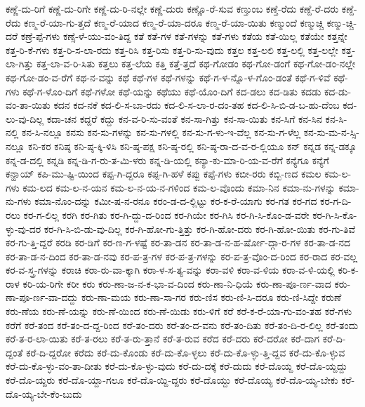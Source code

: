 {ಕಣ್ಣೆ-ದು-ರಿಗೆ
ಕಣ್ಣೆ-ದು-ರಿಗೇ
ಕಣ್ಣೆ-ದು-ರಿ-ನಲ್ಲೇ
ಕಣ್ಣೆ-ದುರು
ಕಣ್ಣೊ-ರೆ-ಸುವ
ಕಣ್ತುಂಬ
ಕಣ್ತೆ-ರೆದು
ಕಣ್ದೆ-ರೆ-ದರು
ಕಣ್ದೆ-ರೆದು
ಕಣ್ಮ-ರೆ-ಯಾ-ಗು-ತ್ತದೆ
ಕಣ್ಮ-ರೆ-ಯಾದ
ಕಣ್ಮ-ರೆ-ಯಾ-ದರೂ
ಕಣ್ಮ-ರೆ-ಯಾ-ಯಿತು
ಕಣ್ಮುಂದೆ
ಕಣ್ಮುಚ್ಚಿ
ಕಣ್ಮು-ಚ್ಚಿ-ದರೆ
ಕಣ್ರೆ-ಪ್ಪೆ-ಗಳು
ಕಣ್ಸೆ-ಳೆ-ಯು-ವಂ-ತಿದ್ದ
ಕತೆ
ಕತೆ-ಗಳ
ಕತೆ-ಗಳನ್ನು
ಕತೆ-ಗಳು
ಕತೆಯ
ಕತೆ-ಯಿಲ್ಲ
ಕತೆಯೇ
ಕತ್ತನ್ನೇ
ಕತ್ತ-ರಿ-ಕೆ-ಗಳು
ಕತ್ತ-ರಿ-ಸ-ಲಾ-ರದು
ಕತ್ತ-ರಿಸಿ
ಕತ್ತ-ರಿಸು
ಕತ್ತ-ರಿ-ಸು-ವುದು
ಕತ್ತಲ
ಕತ್ತ-ಲಲಿ
ಕತ್ತ-ಲಲ್ಲಿ
ಕತ್ತ-ಲಲ್ಲೇ
ಕತ್ತ-ಲಾ-ಗಿತ್ತು
ಕತ್ತ-ಲಾ-ವ-ರಿ-ಸಿತು
ಕತ್ತಲು
ಕತ್ತ-ಲೆಯ
ಕತ್ತಿ
ಕತ್ತೆ-ತ್ತದೆ
ಕಥ-ಗೋಡಂ
ಕಥ-ಗೋ-ಡಂಗೆ
ಕಥ-ಗೋ-ಡಂ-ನಲ್ಲೇ
ಕಥ-ಗೋ-ಡಂ-ವ-ರೆಗೆ
ಕಥ-ನ-ವನ್ನು
ಕಥೆ
ಕಥೆ-ಗಳ
ಕಥೆ-ಗಳನ್ನು
ಕಥೆ-ಗ-ಳ-ನ್ನೊ-ಳ-ಗೊಂ-ಡಂತೆ
ಕಥೆ-ಗ-ಳಿವೆ
ಕಥೆ-ಗಳು
ಕಥೆ-ಗ-ಳೊಂ-ದಿಗೆ
ಕಥೆ-ಗಳೋ
ಕಥೆ-ಯನ್ನು
ಕಥೆಯು
ಕಥೆ-ಯೊಂ-ದಿಗೆ
ಕದ-ಡಲು
ಕದ-ಡಿತು
ಕದಡು
ಕದ-ಡು-ವಂ-ತಾ-ಯಿತು
ಕದನ
ಕದ-ನಕೆ
ಕದ-ಲಿ-ಸ-ಬಾ-ರದು
ಕದ-ಲಿ-ಸ-ಲಾ-ರ-ದಂ-ತಹ
ಕದ-ಲಿ-ಸಿ-ಬಿ-ಡ-ಬ-ಹು-ದೆಂಬ
ಕದ-ಲು-ವು-ದಿಲ್ಲ
ಕದಾ-ಚನ
ಕದ್ದರೆ
ಕದ್ದು
ಕನ-ವ-ರಿ-ಸು-ವಂತೆ
ಕನ-ಸಾ-ಗಿತ್ತು
ಕನ-ಸಾ-ಯಿತು
ಕನ-ಸಿಗೆ
ಕನ-ಸಿನ
ಕನ-ಸಿ-ನಲ್ಲಿ
ಕನ-ಸಿ-ನಲ್ಲೂ
ಕನಸು
ಕನ-ಸು-ಗಳನ್ನು
ಕನ-ಸು-ಗಳಲ್ಲಿ
ಕನ-ಸು-ಗ-ಳು-ಇ-ವೆಲ್ಲ
ಕನ-ಸು-ಗ-ಳೆಲ್ಲ
ಕನ-ಸು-ಮ-ನ-ಸ್ಸಿ-ನಲ್ಲೂ
ಕನಿ-ಕರ
ಕನಿಷ್ಠ
ಕನಿ-ಷ್ಠ-ಕ್ಕಿ-ಳಿಸಿ
ಕನಿ-ಷ್ಠ-ಪಕ್ಷ
ಕನಿ-ಷ್ಠ-ರಲ್ಲಿ
ಕನಿ-ಷ್ಠ-ರಾ-ದ-ವ-ರ-ಲ್ಲಿಯೂ
ಕನ್
ಕನ್ನಡ
ಕನ್ನ-ಡಕ್ಕೂ
ಕನ್ನ-ಡ-ದಲ್ಲಿ
ಕನ್ನಡಿ
ಕನ್ನ-ಡಿ-ಗ-ರು-ತ-ಮಿ-ಳರು
ಕನ್ನ-ಡಿ-ಯಲ್ಲಿ
ಕನ್ಯಾ-ಕು-ಮಾ-ರಿ-ಯ-ವ-ರೆಗೆ
ಕನ್ಯೆಗೂ
ಕನ್ಯೆಗೆ
ಕನ್ಹಾಯ್
ಕಪಿ-ಮು-ಷ್ಟಿ-ಯಿಂದ
ಕಪ್ಪ-ಗಿ-ದ್ದರೂ
ಕಪ್ಪ-ಗಿ-ಹಳೆ
ಕಪ್ಪು
ಕಪ್ಪೆ-ಗಳು
ಕಬೀ-ರರು
ಕಬ್ಬಿ-ಣದ
ಕಮಲ
ಕಮ-ಲ-ಗಳು
ಕಮ-ಲದ
ಕಮ-ಲ-ನ-ಯನ
ಕಮ-ಲ-ನ-ಯ-ನ-ಗಳಿಂದ
ಕಮ-ಲ-ವೊಂದು
ಕಮಾ-ನಿನ
ಕಮಾ-ನು-ಗಳನ್ನು
ಕಮಾ-ನು-ಗಳು
ಕಮಾ-ನೊಂ-ದನ್ನು
ಕಮೀ-ಷ-ನ-ರನೂ
ಕರಂ-ಡ-ದ-ಲ್ಲಿಟ್ಟು
ಕರ-ಕ-ರೆ-ಯಾಗು
ಕರ-ಗತ
ಕರ-ಗದ
ಕರ-ಗ-ದಿ-ರಲು
ಕರ-ಗ-ಲಿಲ್ಲ
ಕರಗಿ
ಕರ-ಗಿತು
ಕರ-ಗಿ-ದ್ದು-ದ-ರಿಂದ
ಕರ-ಗಿಯೇ
ಕರ-ಗಿಸಿ
ಕರ-ಗಿ-ಸಿ-ಕೊಂ-ಡ-ವರೇ
ಕರ-ಗಿ-ಸಿ-ಕೊ-ಳ್ಳು-ವು-ದರ
ಕರ-ಗಿ-ಸಿ-ಬಿ-ಡು-ವು-ದಿಲ್ಲ
ಕರ-ಗಿ-ಹೋ-ಗು-ತ್ತಿತ್ತು
ಕರ-ಗಿ-ಹೋ-ದರು
ಕರ-ಗಿ-ಹೋ-ಯಿತು
ಕರ-ಗು-ತಿವೆ
ಕರ-ಗು-ತ್ತಿ-ದ್ದರೆ
ಕರಡಿ
ಕರ-ಡಿಗೆ
ಕರ-ಣ-ಗ-ಳಷ್ಟೆ
ಕರ-ತಾ-ಡನ
ಕರ-ತಾ-ಡ-ನ-ಹ-ರ್ಷೋ-ದ್ಗಾ-ರ-ಗಳ
ಕರ-ತಾ-ಡ-ನದ
ಕರ-ತಾ-ಡ-ನ-ದಿಂದ
ಕರ-ತಾ-ಡ-ನವು
ಕರ-ಪ-ತ್ರ-ಗಳ
ಕರ-ಪ-ತ್ರ-ಗಳನ್ನು
ಕರ-ಪ-ತ್ರ-ವೊಂ-ದ-ರಿಂದ
ಕರ-ರಾದ
ಕರ-ವಲ್ಲ
ಕರ-ವ-ಸ್ತ್ರ-ಗಳನ್ನು
ಕರಾಚಿ
ಕರಾ-ರು-ವಾ-ಕ್ಕಾಗಿ
ಕರಾ-ಳ-ಸ-ತ್ಯ-ವನ್ನು
ಕರಾ-ವಳಿ
ಕರಾ-ವ-ಳಿಯ
ಕರಾ-ವ-ಳಿ-ಯಲ್ಲಿ
ಕರಿ-ಕ-ರಾಳ
ಕರಿ-ಯ-ರಿಗೇ
ಕರೀ
ಕರು
ಕರು-ಣಾ-ಜ-ನ-ಕ-ಭಾ-ವ-ದಿಂದ
ಕರು-ಣಾ-ನಿ-ಧಿಯೆ
ಕರು-ಣಾ-ಪೂ-ರ್ಣ-ವಾದ
ಕರು-ಣಾ-ಪೂ-ರ್ಣ-ವಾ-ದದ್ದು
ಕರು-ಣಾ-ಮಯ
ಕರು-ಣಾ-ಸಾ-ಗರ
ಕರು-ಣಿಸ
ಕರು-ಣಿ-ಸಿ-ದರೂ
ಕರು-ಣಿ-ಸಿದ್ದೇ
ಕರುಣೆ
ಕರು-ಣೆಯ
ಕರು-ಣೆ-ಯನ್ನು
ಕರು-ಣೆ-ಯಿಂದ
ಕರು-ಣೆ-ಯಿಡು
ಕರು-ಳಿಗೆ
ಕರೆ
ಕರೆ-ಕ-ರೆ-ಯಾ-ಗು-ವಂ-ತಹ
ಕರೆ-ಗಳು
ಕರೆಗೆ
ಕರೆ-ತಂದ
ಕರೆ-ತಂ-ದ-ದ್ದ-ರಿಂದ
ಕರೆ-ತಂ-ದರು
ಕರೆ-ತಂ-ದ-ವನು
ಕರೆ-ತಂ-ದಿತು
ಕರೆ-ತಂ-ದಿ-ರ-ಲಿಲ್ಲ
ಕರೆ-ತಂದು
ಕರೆ-ತ-ರ-ಲಾ-ಯಿತು
ಕರೆ-ತ-ರಲು
ಕರೆ-ತ-ರು-ತ್ತಾನೆ
ಕರೆ-ತ-ರುವ
ಕರೆದ
ಕರೆ-ದರು
ಕರೆ-ದರೋ
ಕರೆ-ದಾಗ
ಕರೆ-ದಿ-ದ್ದಂತೆ
ಕರೆ-ದಿ-ದ್ದರೋ
ಕರೆದು
ಕರೆ-ದು-ಕೊಂಡು
ಕರೆ-ದು-ಕೊ-ಳ್ಳಲು
ಕರೆ-ದು-ಕೊ-ಳ್ಳು-ತ್ತಿ-ದ್ದವ
ಕರೆ-ದು-ಕೊ-ಳ್ಳುವ
ಕರೆ-ದು-ಕೊ-ಳ್ಳು-ವಂ-ತಾ-ದೀತು
ಕರೆ-ದು-ಕೊ-ಳ್ಳು-ವುದು
ಕರೆ-ದು-ದಕ್ಕೆ
ಕರೆ-ದುದು
ಕರೆ-ದೊಯ್ದ
ಕರೆ-ದೊ-ಯ್ದದ್ದು
ಕರೆ-ದೊ-ಯ್ದರು
ಕರೆ-ದೊ-ಯ್ದಾ-ಗಲೂ
ಕರೆ-ದೊ-ಯ್ದಿ-ದ್ದರು
ಕರೆ-ದೊಯ್ದು
ಕರೆ-ದೊಯ್ಯ
ಕರೆ-ದೊ-ಯ್ಯ-ಬೇಕು
ಕರೆ-ದೊ-ಯ್ಯ-ಬೇ-ಕೆಂ-ಬುದು
}
